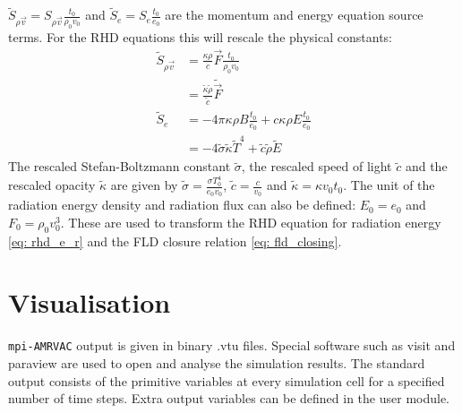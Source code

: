$\tilde{S}_{\rho \vec{v}} = S_{\rho \vec{v}} \frac{t_0}{\rho_0 v_0}$ and $\tilde{S}_e = S_e \frac{t_0}{e_0}$ are the momentum and energy equation source terms. For the RHD equations this will rescale the physical constants:
\begin{align}
	\tilde{S}_{\rho \vec{v}} &=  \frac{\kappa \rho}{c} \vec{F} \frac{t_0}{\rho_0 v_0} \\
							 &=  \frac{\tilde{\kappa}\tilde{\rho}}{\tilde{c}} \tilde{\vec{F}} \\
	\tilde{S}_e &= -4\pi \kappa\rho B \frac{t_0}{e_0}  + c \kappa \rho E \frac{t_0}{e_0} \\
				&= -4 \tilde{\sigma} \tilde{\kappa} \tilde{T}^4 + \tilde{c} \tilde{\rho} \tilde{E}
\end{align}
The rescaled Stefan-Boltzmann constant $\tilde{\sigma}$, the rescaled speed of light $\tilde{c}$ and the rescaled opacity $\tilde{\kappa}$ are given by $\tilde{\sigma} = \frac{\sigma T_0^4}{e_0 v_0}$, $\tilde{c} = \frac{c}{v_0}$ and $\tilde{\kappa} = \kappa v_0 t_0$. The unit of the radiation energy density and radiation flux can also be defined: $E_0 = e_0$ and $F_0 = \rho_0 v_0^3$. These are used to transform the RHD equation for radiation energy \eqref{eq: rhd_e_r} and the FLD closure relation \eqref{eq: fld_closing}. 

\section{Visualisation}
\texttt{mpi-AMRVAC} output is given in binary .vtu files. Special software such as visit \citep{} and paraview are used to open and analyse the simulation results. The standard output consists of the primitive variables at every simulation cell for a specified number of time steps. Extra output variables can be defined in the user module.

